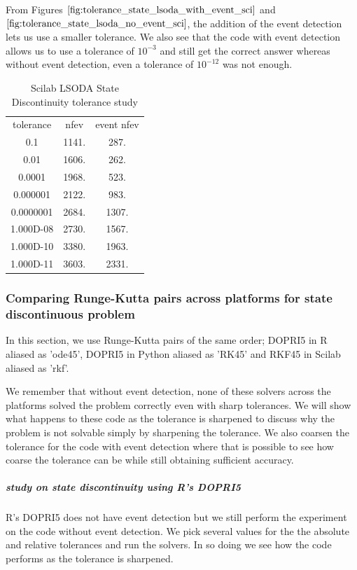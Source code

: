 From Figures $\ref{fig:tolerance_state_lsoda_with_event_sci}$ and $\ref{fig:tolerance_state_lsoda_no_event_sci}$, the addition of the event detection lets us use a smaller tolerance. We also see that the code with event detection allows us to use a tolerance of $10^{-3}$ and still get the correct answer whereas without event detection, even a tolerance of $10^{-12}$ was not enough. 

\begin{table}[h]
\caption {Scilab LSODA State Discontinuity tolerance study} \label{tab:tolerance_state_discontinuity_lsoda_scilab} 
\begin{center}
\begin{tabular}{ c c c }
tolerance & nfev & event nfev \\ 
   0.1       & 1141.  & 287.  \\
   0.01      & 1606.  & 262.  \\
   0.0001    & 1968.  & 523. \\
   0.000001  & 2122.  & 983.  \\
   0.0000001 &  2684. & 1307.  \\
   1.000D-08 &  2730. & 1567. \\
   1.000D-10 &  3380. & 1963. \\
   1.000D-11 &  3603. & 2331. \\
\end{tabular}
\end{center}
\end{table}

\subsubsection{Comparing Runge-Kutta pairs across platforms for state discontinuous problem}

In this section, we use Runge-Kutta pairs of the same order; DOPRI5 in R aliased as 'ode45', DOPRI5 in Python aliased as 'RK45' and RKF45 in Scilab aliased as 'rkf'. 

We remember that without event detection, none of these solvers across the platforms solved the problem correctly even with sharp tolerances. We will show what happens to these code as the tolerance is sharpened to discuss why the problem is not solvable simply by sharpening the tolerance. We also coarsen the tolerance for the code with event detection where that is possible to see how coarse the tolerance can be while still obtaining sufficient accuracy.

\subparagraph{study on state discontinuity using R's DOPRI5}
R's DOPRI5 does not have event detection but we still perform the experiment on the code without event detection. We pick several values for the the absolute and relative tolerances and run the solvers. In so doing we see how the code performs as the tolerance is sharpened. 

